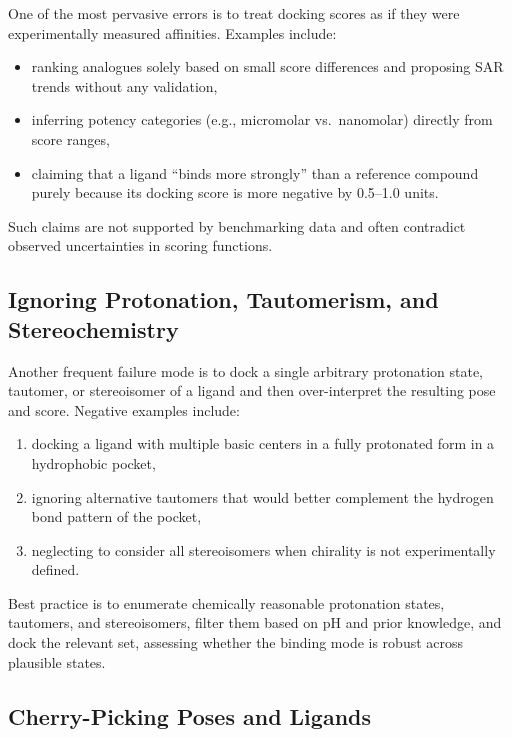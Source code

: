 \documentclass[12pt,a4paper]{article}
\begin{document}
One of the most pervasive errors is to treat docking scores as if they were experimentally measured affinities. Examples include:

\begin{itemize}
  \item ranking analogues solely based on small score differences and proposing SAR trends without any validation,
  \item inferring potency categories (e.g., micromolar vs.\ nanomolar) directly from score ranges,
  \item claiming that a ligand ``binds more strongly'' than a reference compound purely because its docking score is more negative by 0.5--1.0 units.
\end{itemize}

Such claims are not supported by benchmarking data and often contradict observed uncertainties in scoring functions.\cite{CH8_Warren2006,CH8_Cheng2009}

\subsection{Ignoring Protonation, Tautomerism, and Stereochemistry}

Another frequent failure mode is to dock a single arbitrary protonation state, tautomer, or stereoisomer of a ligand and then over-interpret the resulting pose and score. Negative examples include:

\begin{enumerate}
  \item docking a ligand with multiple basic centers in a fully protonated form in a hydrophobic pocket,
  \item ignoring alternative tautomers that would better complement the hydrogen bond pattern of the pocket,
  \item neglecting to consider all stereoisomers when chirality is not experimentally defined.
\end{enumerate}

Best practice is to enumerate chemically reasonable protonation states, tautomers, and stereoisomers, filter them based on pH and prior knowledge, and dock the relevant set, assessing whether the binding mode is robust across plausible states.

\subsection{Cherry-Picking Poses and Ligands}
\end{document}
